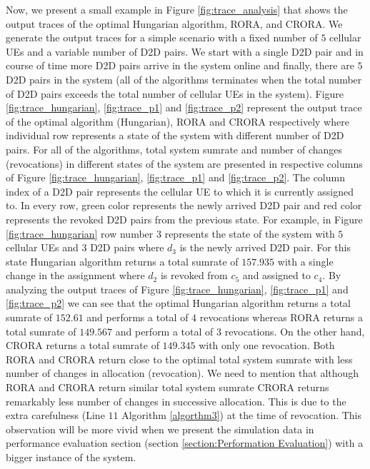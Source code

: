 \documentclass[times]{dacauth}
\begin{document}
\smallskip
\noindent
Now, we present a small example in Figure \ref{fig:trace_analysis} that shows the output traces of the optimal Hungarian algorithm, RORA, and CRORA. We generate the output traces for a simple scenario with a fixed number of $5$ cellular UEs and a variable number of D2D pairs. We start with a single D2D pair and in course of time more D2D pairs arrive in the system online and finally, there are $5$ D2D pairs in the system (all of the algorithms terminates when the total number of D2D pairs exceeds the total number of cellular UEs in the system). Figure \ref{fig:trace_hungarian}, \ref{fig:trace_p1} and  \ref{fig:trace_p2} represent the output trace of the optimal algorithm (Hungarian), RORA and CRORA respectively where individual row represents a state of the system with different number of D2D pairs. For all of the algorithms, total system sumrate and number of changes (revocations) in different states of the system are presented in respective columns of Figure \ref{fig:trace_hungarian}, \ref{fig:trace_p1} and  \ref{fig:trace_p2}. The column index of a D2D pair represents the cellular UE to which it is currently assigned to. In every row, green color represents the newly arrived D2D pair and red color represents the revoked D2D pairs from the previous state. For example, in Figure \ref{fig:trace_hungarian} row number $3$ represents the state of the system with $5$ cellular UEs and $3$ D2D pairs where $d_3$ is the newly arrived D2D pair. For this state Hungarian algorithm returns a total sumrate of $157.935$ with a single change in the assignment where $d_2$ is revoked from $c_5$ and assigned to $c_4$. By analyzing the output traces of Figure \ref{fig:trace_hungarian}, \ref{fig:trace_p1} and  \ref{fig:trace_p2} we can see that the optimal Hungarian algorithm returns a total sumrate of $152.61$ and performs a total of $4$ revocations whereas RORA returns a total sumrate of $149.567$ and perform a total of $3$ revocations. On the other hand, CRORA returns a total sumrate of $149.345$ with only one revocation. Both RORA and CRORA return close to the optimal total system sumrate with less number of changes in allocation (revocation). We need to mention that although RORA and CRORA return similar total system sumrate CRORA returns remarkably less number of changes in successive allocation. This is due to the extra carefulness (Line $11$ Algorithm \ref{algorthm3}) at the time of revocation. This observation will be more vivid when we present the simulation data in performance evaluation section (section \ref{section:Performation Evaluation}) with a bigger instance of the system. 
\end{document}
